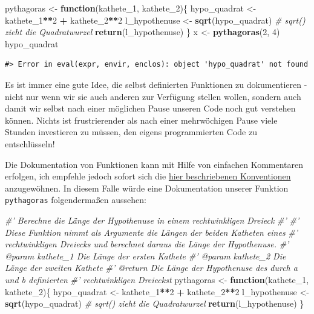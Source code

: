 \documentclass[]{book}
\newenvironment{Shaded}{\begin{snugshade}}{\end{snugshade}}
\newcommand{\KeywordTok}[1]{\textcolor[rgb]{0.13,0.29,0.53}{\textbf{#1}}}
\newcommand{\DecValTok}[1]{\textcolor[rgb]{0.00,0.00,0.81}{#1}}
\newcommand{\StringTok}[1]{\textcolor[rgb]{0.31,0.60,0.02}{#1}}
\newcommand{\CommentTok}[1]{\textcolor[rgb]{0.56,0.35,0.01}{\textit{#1}}}
\newcommand{\ControlFlowTok}[1]{\textcolor[rgb]{0.13,0.29,0.53}{\textbf{#1}}}
\newcommand{\OperatorTok}[1]{\textcolor[rgb]{0.81,0.36,0.00}{\textbf{#1}}}
\newcommand{\NormalTok}[1]{#1}
\begin{document}
\begin{Shaded}
\begin{Highlighting}[]
\NormalTok{pythagoras <-}\StringTok{ }\ControlFlowTok{function}\NormalTok{(kathete_}\DecValTok{1}\NormalTok{, kathete_}\DecValTok{2}\NormalTok{)\{}
\NormalTok{  hypo_quadrat <-}\StringTok{ }\NormalTok{kathete_}\DecValTok{1}\OperatorTok{**}\DecValTok{2} \OperatorTok{+}\StringTok{ }\NormalTok{kathete_}\DecValTok{2}\OperatorTok{**}\DecValTok{2}
\NormalTok{  l_hypothenuse <-}\StringTok{ }\KeywordTok{sqrt}\NormalTok{(hypo_quadrat) }\CommentTok{# sqrt() zieht die Quadratwurzel}
  \KeywordTok{return}\NormalTok{(l_hypothenuse)}
\NormalTok{\}}
\NormalTok{x <-}\StringTok{ }\KeywordTok{pythagoras}\NormalTok{(}\DecValTok{2}\NormalTok{, }\DecValTok{4}\NormalTok{)}
\NormalTok{hypo_quadrat}
\end{Highlighting}
\end{Shaded}

\begin{verbatim}
#> Error in eval(expr, envir, enclos): object 'hypo_quadrat' not found
\end{verbatim}

Es ist immer eine gute Idee, die selbst definierten Funktionen zu
dokumentieren - nicht nur wenn wir sie auch anderen zur Verfügung
stellen wollen, sondern auch damit wir selbst nach einer möglichen Pause
unseren Code noch gut verstehen können. Nichts ist frustrierender als
nach einer mehrwöchigen Pause viele Stunden investieren zu müssen, den
eigens programmierten Code zu entschlüsseln!

Die Dokumentation von Funktionen kann mit Hilfe von einfachen
Kommentaren erfolgen, ich empfehle jedoch sofort sich die
\href{https://r-pkgs.org/man.html\#man-functions}{hier beschriebenen
Konventionen} anzugewöhnen. In diesem Falle würde eine Dokumentation
unserer Funktion \texttt{pythagoras} folgendermaßen aussehen:

\begin{Shaded}
\begin{Highlighting}[]
\CommentTok{#' Berechne die Länge der Hypothenuse in einem rechtwinkligen Dreieck}
\CommentTok{#' }
\CommentTok{#' Diese Funktion nimmt als Argumente die Längen der beiden Katheten eines}
\CommentTok{#'  rechtwinkligen Dreiecks und berechnet daraus die Länge der Hypothenuse.}
\CommentTok{#' @param kathete_1 Die Länge der ersten Kathete}
\CommentTok{#' @param kathete_2 Die Länge der zweiten Kathete}
\CommentTok{#' @return Die Länge der Hypothenuse des durch a und b definierten }
\CommentTok{#'  rechtwinkligen Dreieckst}
\NormalTok{pythagoras <-}\StringTok{ }\ControlFlowTok{function}\NormalTok{(kathete_}\DecValTok{1}\NormalTok{, kathete_}\DecValTok{2}\NormalTok{)\{}
\NormalTok{  hypo_quadrat <-}\StringTok{ }\NormalTok{kathete_}\DecValTok{1}\OperatorTok{**}\DecValTok{2} \OperatorTok{+}\StringTok{ }\NormalTok{kathete_}\DecValTok{2}\OperatorTok{**}\DecValTok{2}
\NormalTok{  l_hypothenuse <-}\StringTok{ }\KeywordTok{sqrt}\NormalTok{(hypo_quadrat) }\CommentTok{# sqrt() zieht die Quadratwurzel}
  \KeywordTok{return}\NormalTok{(l_hypothenuse)}
\NormalTok{\}}
\end{Highlighting}
\end{Shaded}
\end{document}
